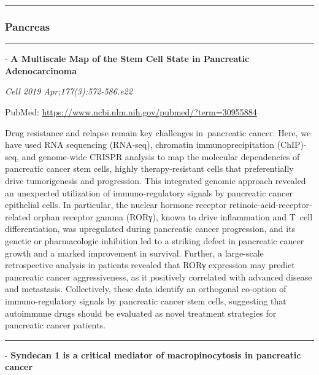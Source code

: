 \documentclass[]{article}
\begin{document}
\begin{center}\rule{0.5\linewidth}{\linethickness}\end{center}

\hypertarget{pancreas-2}{%
\subsubsection{Pancreas}\label{pancreas-2}}

\begin{center}\rule{0.5\linewidth}{\linethickness}\end{center}

 - \textbf{A Multiscale Map of the Stem Cell State in Pancreatic
Adenocarcinoma}

\emph{Cell 2019 Apr;177(3):572-586.e22}

PubMed: \url{https://www.ncbi.nlm.nih.gov/pubmed/?term=30955884}

Drug resistance and relapse remain key challenges in~pancreatic cancer.
Here, we have used RNA sequencing (RNA-seq), chromatin
immunoprecipitation (ChIP)-seq, and genome-wide CRISPR analysis to map
the molecular dependencies of pancreatic cancer stem cells, highly
therapy-resistant cells that preferentially drive tumorigenesis and
progression. This integrated genomic approach revealed an unexpected
utilization of immuno-regulatory signals by pancreatic cancer epithelial
cells. In particular, the nuclear hormone receptor
retinoic-acid-receptor-related orphan receptor gamma (RORγ), known to
drive inflammation and T~cell differentiation, was upregulated during
pancreatic cancer progression, and its genetic or pharmacologic
inhibition led to a striking defect in pancreatic cancer growth and a
marked improvement in survival. Further, a large-scale retrospective
analysis in patients revealed that RORγ expression may predict
pancreatic cancer aggressiveness, as it positively correlated with
advanced disease and metastasis. Collectively, these data identify an
orthogonal co-option of immuno-regulatory signals by pancreatic cancer
stem cells, suggesting that autoimmune drugs should be evaluated as
novel treatment strategies for pancreatic cancer patients.

{}

{}

\begin{center}\rule{0.5\linewidth}{\linethickness}\end{center}

 - \textbf{Syndecan 1 is a critical mediator of macropinocytosis in
pancreatic cancer}
\end{document}
